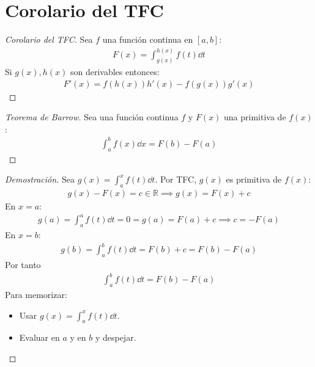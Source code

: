 \documentclass{article}
\begin{document}
\section{Corolario del TFC}
\begin{proof}[Corolario del TFC]
Sea $f$ una función continua en $[a,b]$:
\begin{equation}
    \begin{split}
        F(x)= \int _{g(x)}^{h(x)}f(t) \dd{t}
    \end{split}
\end{equation}
Si $g(x), h(x)$ son derivables entonces:
\begin{equation}
    \begin{split}
        F'(x)=f(h(x))h'(x) - f(g(x))g'(x)
    \end{split}
\end{equation}
\end{proof}
\begin{proof}[Teorema de Barrow]
    Sea una función continua $f$ y $F(x)$ una primitiva de $f(x)$:
    \begin{equation}
        \begin{split}
            \int _{a}^{b} f(x) \dd{x} = F(b)-F(a)
        \end{split}
    \end{equation}
\end{proof}
\begin{proof}[Demostración]
    Sea $g(x)= \int _{a}^{x} f(t) \dd{t}$. Por TFC, $g(x)$ es primitiva de $f(x)$:
    \begin{equation}
        \begin{split}
            g(x)-F(x) = c \in \mathbb{R} \implies g(x)= F(x)+c
        \end{split}
    \end{equation}
    En $x=a$:
    \begin{equation}
        \begin{split}
            g(a) = \int _{a}^{a}f(t) \dd{t}=0=g(a)= F(a)+c \implies c = -F(a)
        \end{split}
    \end{equation}
    En $x=b$:
    \begin{equation}
        \begin{split}
            g(b) = \int _{a}^{b}f(t) \dd{t}= F(b)+c = F(b)-F(a)
        \end{split}
    \end{equation}
    Por tanto
    \begin{equation}
        \begin{split}
            \int _{a}^{b} f(t) \dd{t} = F(b)-F(a)
        \end{split}
    \end{equation}
Para memorizar:
\begin{itemize}
	\item Usar $g(x)= \int _{a}^{x} f(t) \dd{t}$.
	\item Evaluar en \(a\) y en \(b\) y despejar. 
\end{itemize}
\end{proof}
\end{document}
